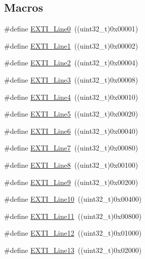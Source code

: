 \subsection*{Macros}
\begin{DoxyCompactItemize}
\item 
\#define \hyperlink{group___e_x_t_i___lines_gac2a65680200dd5f4f7eab29cd4091a75}{E\+X\+T\+I\+\_\+\+Line0}~((uint32\+\_\+t)0x00001)
\item 
\#define \hyperlink{group___e_x_t_i___lines_gae7c6ab2a0880ce3810641ee0585104cd}{E\+X\+T\+I\+\_\+\+Line1}~((uint32\+\_\+t)0x00002)
\item 
\#define \hyperlink{group___e_x_t_i___lines_gaec4189bb2709c8c15a0339d1b0b9865a}{E\+X\+T\+I\+\_\+\+Line2}~((uint32\+\_\+t)0x00004)
\item 
\#define \hyperlink{group___e_x_t_i___lines_gadea3ef6ab7e8bacc686689de8711b98c}{E\+X\+T\+I\+\_\+\+Line3}~((uint32\+\_\+t)0x00008)
\item 
\#define \hyperlink{group___e_x_t_i___lines_gab33b1fe19306e9e60f8f8d0928b800be}{E\+X\+T\+I\+\_\+\+Line4}~((uint32\+\_\+t)0x00010)
\item 
\#define \hyperlink{group___e_x_t_i___lines_ga6b4c6292e3abd521cab2bf99d37a15c6}{E\+X\+T\+I\+\_\+\+Line5}~((uint32\+\_\+t)0x00020)
\item 
\#define \hyperlink{group___e_x_t_i___lines_ga97a5145d1d2612dd53bdd9db3d366873}{E\+X\+T\+I\+\_\+\+Line6}~((uint32\+\_\+t)0x00040)
\item 
\#define \hyperlink{group___e_x_t_i___lines_ga3b7155d54a4a98394b599718901ccbe5}{E\+X\+T\+I\+\_\+\+Line7}~((uint32\+\_\+t)0x00080)
\item 
\#define \hyperlink{group___e_x_t_i___lines_gacd51e087a088c3315049394cddf79e88}{E\+X\+T\+I\+\_\+\+Line8}~((uint32\+\_\+t)0x00100)
\item 
\#define \hyperlink{group___e_x_t_i___lines_ga340ca6bb77b7a2d7747c78e7d3370360}{E\+X\+T\+I\+\_\+\+Line9}~((uint32\+\_\+t)0x00200)
\item 
\#define \hyperlink{group___e_x_t_i___lines_gaefb90b266f5fc1571ed4606bbff1f1d7}{E\+X\+T\+I\+\_\+\+Line10}~((uint32\+\_\+t)0x00400)
\item 
\#define \hyperlink{group___e_x_t_i___lines_ga6157b34c53e9b5cb8ee0d7ac3f5ba292}{E\+X\+T\+I\+\_\+\+Line11}~((uint32\+\_\+t)0x00800)
\item 
\#define \hyperlink{group___e_x_t_i___lines_gab73a0a31f1814118955099b9dd3bdfef}{E\+X\+T\+I\+\_\+\+Line12}~((uint32\+\_\+t)0x01000)
\item 
\#define \hyperlink{group___e_x_t_i___lines_gae382388ac34b78917a7bd06562e35c42}{E\+X\+T\+I\+\_\+\+Line13}~((uint32\+\_\+t)0x02000)

\end{DoxyCompactItemize}
